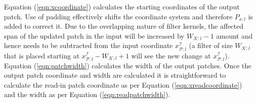Equation (\ref{eqn:xcoordinate}) calculates the starting coordinates of the output patch.
Use of padding effectively shifts the coordinate system and therefore $P_{x:l}$ is added to correct it.
Due to the overlapping nature of filter kernels, the affected span of the updated patch in the input will be increased by $W_{\mathcal{K}:l}-1$ amount and hence needs to be subtracted from the input coordinate $x^\mathcal{I}_{\mathcal{P}:l}$ (a filter of size $W_{\mathcal{K}:l}$ that is placed starting at $x^\mathcal{I}_{\mathcal{P}:l} - W_{\mathcal{K}:l} + 1$ will see the new change at $x^\mathcal{I}_{\mathcal{P}:l}$).
Equation (\ref{eqn:patchwidth}) calculates the width of the output patches.
Once the output patch coordinate and width are calculated it is straightforward to calculate the read-in patch coordinate as per Equation (\ref{eqn:xreadcoordinate}) and the width as per Equation (\ref{eqn:readpatchwidth}).


\begin{table}[t]
  \centering
  \caption{Additional symbols used in the Section \ref{sec:optimizer} and Section \ref{sec:approx}}
\label{table:optimizer_symbols}
\end{table}

